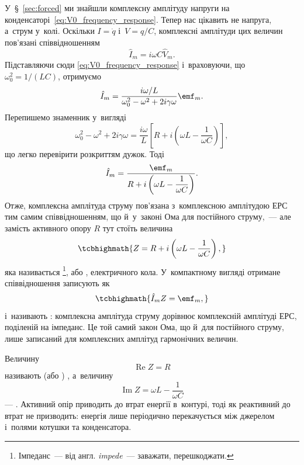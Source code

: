 У~\S~\ref{sec:forced} ми знайшли комплексну амплітуду напруги на конденсаторі~\eqref{eq:V0_frequency_response}. Тепер нас цікавить не напруга, а~струм у~колі. Оскільки $I = \dot{q}$ і~$V = q/C$, комплексні амплітуди цих величин пов'язані співвідношенням
\begin{equation*}
	\hat{I}_m = i\omega C \hat{V}_m.
\end{equation*}
Підставляючи сюди \eqref{eq:V0_frequency_response} і~враховуючи, що $\omega_0^2 = 1/(LC)$, отримуємо
\begin{equation*}
	\hat{I}_m = \frac{i\omega / L}{\omega_0^2 - \omega^2 + 2i\gamma\omega}\emf_m.
\end{equation*}
Перепишемо знаменник у~вигляді
\begin{equation*}
	\omega_0^2 - \omega^2 + 2i\gamma\omega = \frac{i\omega}{L}\left[R + i\left(\omega L - \frac{1}{\omega C}\right)\right],
\end{equation*}
що легко перевірити розкриттям дужок. Тоді
\begin{equation}\label{eq:Ohm_complex_derived}
	\hat{I}_m = \frac{\emf_m}{R + i\left(\omega L - \dfrac{1}{\omega C}\right)}.
\end{equation}
Отже, комплексна амплітуда струму пов'язана з~комплексною амплітудою ЕРС тим самим співвідношенням, що й~у~законі Ома для постійного струму,~--- але замість активного опору $R$ тут стоїть величина
\begin{equation}\label{eq:impedance}
	\tcbhighmath{
		Z = R + i\left(\omega L - \frac{1}{\omega C}\right),
	}
\end{equation}
яка називається \footnote{Імпеданс~--- від англ. \emph{impede}~--- заважати, перешкоджати.}, або , електричного кола. У~компактному вигляді отримане співвідношення записують як
\begin{equation}\label{eq:Ohm_complex}
	\tcbhighmath{
		\hat{I}_m Z = \emf_m,
	}
\end{equation}
і~називають : комплексна амплітуда струму дорівнює комплексній амплітуді ЕРС, поділеній на імпеданс. Це той самий закон Ома, що й~для постійного струму, лише записаний для комплексних амплітуд гармонічних величин.

Величину
\begin{equation*}
	\operatorname{Re} Z = R
\end{equation*}
називають  (або ) , а~величину
\begin{equation*}
	\operatorname{Im} Z = \omega L - \frac{1}{\omega C}
\end{equation*}
--- . Активний опір приводить до втрат енергії в~контурі, тоді як реактивний до втрат не призводить: енергія лише періодично перекачується між джерелом і~полями котушки та конденсатора.

